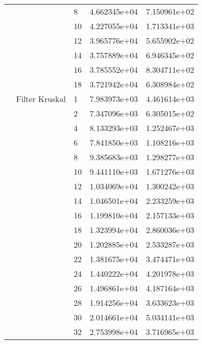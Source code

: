 \begin{tabular}{lllrr}
                      &            & 8  &  4.662345e+04 &  7.150961e+02 \\
                      &            & 10 &  4.227055e+04 &  1.713341e+03 \\
                      &            & 12 &  3.965776e+04 &  5.655902e+02 \\
                      &            & 14 &  3.757889e+04 &  6.946345e+02 \\
                      &            & 16 &  3.785552e+04 &  8.304711e+02 \\
                      &            & 18 &  3.721942e+04 &  6.308984e+02 \\
                      & Filter Kruskal & 1  &  7.983973e+03 &  4.461614e+03 \\
                      &            & 2  &  7.347096e+03 &  6.305015e+02 \\
                      &            & 4  &  8.133293e+03 &  1.252467e+03 \\
                      &            & 6  &  7.841850e+03 &  1.108216e+03 \\
                      &            & 8  &  9.385683e+03 &  1.298277e+03 \\
                      &            & 10 &  9.441110e+03 &  1.671276e+03 \\
                      &            & 12 &  1.034069e+04 &  1.300242e+03 \\
                      &            & 14 &  1.046501e+04 &  2.233259e+03 \\
                      &            & 16 &  1.199810e+04 &  2.157133e+03 \\
                      &            & 18 &  1.323994e+04 &  2.860036e+03 \\
                      &            & 20 &  1.202885e+04 &  2.533287e+03 \\
                      &            & 22 &  1.381675e+04 &  3.474471e+03 \\
                      &            & 24 &  1.440222e+04 &  4.201978e+03 \\
                      &            & 26 &  1.496861e+04 &  4.187164e+03 \\
                      &            & 28 &  1.914256e+04 &  3.633623e+03 \\
                      &            & 30 &  2.014661e+04 &  5.034141e+03 \\
                      &            & 32 &  2.753998e+04 &  3.716965e+03 \\

\end{tabular}
